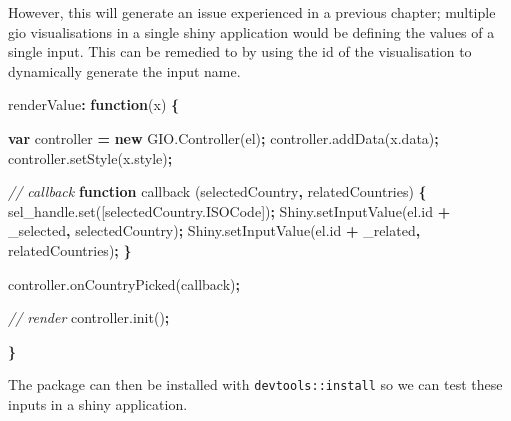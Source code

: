 \documentclass[
]{krantz}
\makeatletter
\newenvironment{Shaded}{\begin{snugshade}}{\end{snugshade}}
\newcommand{\AttributeTok}[1]{\textcolor[rgb]{0.61,0.61,0.61}{#1}}
\newcommand{\CommentTok}[1]{\textcolor[rgb]{0.37,0.37,0.37}{\textit{#1}}}
\newcommand{\KeywordTok}[1]{\textcolor[rgb]{0.27,0.27,0.27}{\textbf{#1}}}
\newcommand{\NormalTok}[1]{#1}
\newcommand{\OperatorTok}[1]{\textcolor[rgb]{0.43,0.43,0.43}{\textbf{#1}}}
\newcommand{\StringTok}[1]{\textcolor[rgb]{0.5,0.5,0.5}{#1}}
\newcommand{\VariableTok}[1]{\textcolor[rgb]{0,0,0}{#1}}
\newenvironment{kframe}{%
\medskip{}
\setlength{\fboxsep}{.8em}
 \def\at@end@of@kframe{}%
 \ifinner\ifhmode%
  \def\at@end@of@kframe{\end{minipage}}%
  \begin{minipage}{\columnwidth}%
 \fi\fi%
 \def\FrameCommand##1{\hskip\@totalleftmargin \hskip-\fboxsep
 \colorbox{shadecolor}{##1}\hskip-\fboxsep
     \hskip-\linewidth \hskip-\@totalleftmargin \hskip\columnwidth}%
 \MakeFramed {\advance\hsize-\width
   \@totalleftmargin\z@ \linewidth\hsize
   \@setminipage}}%
 {\par\unskip\endMakeFramed%
 \at@end@of@kframe}
\renewenvironment{Shaded}{\begin{kframe}}{\end{kframe}}
\makeatother
\begin{document}
However, this will generate an issue experienced in a previous chapter; multiple gio visualisations in a single shiny application would be defining the values of a single input. This can be remedied to by using the id of the visualisation to dynamically generate the input name.

\begin{Shaded}
\begin{Highlighting}[]
\NormalTok{renderValue}\OperatorTok{:} \KeywordTok{function}\NormalTok{(x) }\OperatorTok{\{}

  \KeywordTok{var}\NormalTok{ controller }\OperatorTok{=} \KeywordTok{new} \VariableTok{GIO}\NormalTok{.}\AttributeTok{Controller}\NormalTok{(el)}\OperatorTok{;}
  \VariableTok{controller}\NormalTok{.}\AttributeTok{addData}\NormalTok{(}\VariableTok{x}\NormalTok{.}\AttributeTok{data}\NormalTok{)}\OperatorTok{;}
  \VariableTok{controller}\NormalTok{.}\AttributeTok{setStyle}\NormalTok{(}\VariableTok{x}\NormalTok{.}\AttributeTok{style}\NormalTok{)}\OperatorTok{;}

  \CommentTok{// callback}
  \KeywordTok{function} \AttributeTok{callback}\NormalTok{ (selectedCountry}\OperatorTok{,}\NormalTok{ relatedCountries) }\OperatorTok{\{}
    \VariableTok{sel\_handle}\NormalTok{.}\AttributeTok{set}\NormalTok{([}\VariableTok{selectedCountry}\NormalTok{.}\AttributeTok{ISOCode}\NormalTok{])}\OperatorTok{;}
    \VariableTok{Shiny}\NormalTok{.}\AttributeTok{setInputValue}\NormalTok{(}\VariableTok{el}\NormalTok{.}\AttributeTok{id} \OperatorTok{+} \StringTok{\textquotesingle{}\_selected\textquotesingle{}}\OperatorTok{,}\NormalTok{ selectedCountry)}\OperatorTok{;}
    \VariableTok{Shiny}\NormalTok{.}\AttributeTok{setInputValue}\NormalTok{(}\VariableTok{el}\NormalTok{.}\AttributeTok{id} \OperatorTok{+} \StringTok{\textquotesingle{}\_related\textquotesingle{}}\OperatorTok{,}\NormalTok{ relatedCountries)}\OperatorTok{;}
  \OperatorTok{\}}

  \VariableTok{controller}\NormalTok{.}\AttributeTok{onCountryPicked}\NormalTok{(callback)}\OperatorTok{;}

  \CommentTok{// render}
  \VariableTok{controller}\NormalTok{.}\AttributeTok{init}\NormalTok{()}\OperatorTok{;}

\OperatorTok{\}}
\end{Highlighting}
\end{Shaded}

The package can then be installed with \texttt{devtools::install} so we can test these inputs in a shiny application.
\end{document}
